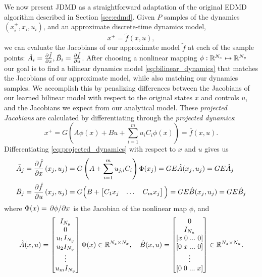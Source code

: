 \documentclass{article}
\begin{document}
We now present JDMD as a straightforward adaptation of the original EDMD algorithm described
in Section \ref{sec:edmd}. Given $P$ samples of the dynamics $(x_i^+, x_i, u_i)$, and an
approximate discrete-time dynamics model,
\begin{equation}
  x^+ = \tilde{f}(x,u),
\end{equation}
we can evaluate the Jacobians of our approximate model $\tilde{f}$ at each of the sample
points: $\tilde{A}_i = \pdv{\tilde{f}}{x}, \tilde{B}_i = \pdv{\tilde{f}}{u}$. After
choosing a nonlinear mapping $\phi : \mathbb{R}^{N_x} \mapsto \mathbb{R}^{N_y}$ our goal is to find a
bilinear dynamics model \eqref{eq:bilinear_dynamics} that matches the Jacobians of our
approximate model, while also matching our dynamics samples. We accomplish this by 
penalizing differences between the Jacobians of our learned bilinear model with respect to 
the original states $x$ and controls $u$, and the Jacobians we expect from our analytical 
model. These \textit{projected Jacobians} are calculated by differentiating through the 
\textit{projected dynamics}:
\begin{equation} \label{eq:projected_dynamics}
  x^+ = G \left( A \phi(x) + B u + \sum_{i=1}^m u_i C_i \phi(x) \right)  = \bar{f}(x,u).
\end{equation}
Differentiating \eqref{eq:projected_dynamics} with respect to $x$ and $u$ gives us
\begin{subequations} \label{eq:projected_jacobians}
  \begin{align}
    \bar{A}_j &= \pdv{\hat{f}}{x}\left(x_j,u_j\right) 
    = G \left(A + \sum_{i=1}^m u_{j,i} C_i \right) \Phi(x_j)
    = G E \hat{A}(x_j,u_j) = G E \hat{A}_j \\
    \bar{B}_j &= \pdv{\hat{f}}{u}\left(x_j,u_j\right) 
    = G \Big(B + \begin{bmatrix} C_1 x_j & \dots & C_m x_j \end{bmatrix} \Big)
    = G E \hat{B}(x_j,u_j) = G E \hat{B}_j
  \end{align}
\end{subequations}
where $\Phi(x) = \pdv*{\phi}{x}$ is the Jacobian of the nonlinear map $\phi$, and
\begin{equation}
  \hat{A}(x,u) =  \begin{bmatrix} 
    I_{N_y} \\ 0 \\ u_1 I_{N_y} \\ u_2 I_{N_y} \\ \vdots \\ u_m I_{N_y} 
  \end{bmatrix} \Phi(x) \in \mathbb{R}^{N_z \times N_x}, \quad
  \hat{B}(x,u) = \begin{bmatrix} 
    0 \\ 
    I_{N_u} \\ 
    [x \; 0 \; ... \; 0] \\
    [0 \; x \; ... \; 0] \\
    \vdots \\
    [0 \; 0 \; ... \; x] \\
  \end{bmatrix} \in \mathbb{R}^{N_z \times N_u}.
\end{equation}
\end{document}
